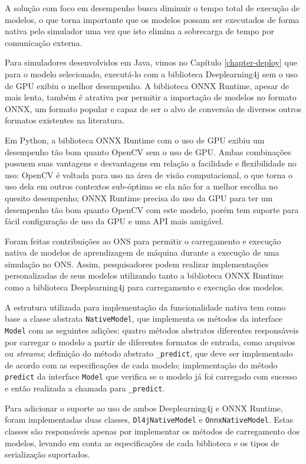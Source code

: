 A solução com foco em desempenho busca diminuir o tempo total de execução de modelos, o que torna importante que os modelos possam ser executados de forma nativa pelo simulador uma vez que isto elimina a sobrecarga de tempo por comunicação externa.

Para simuladores desenvolvidos em Java, vimos no Capítulo \ref{chapter-deploy} que para o modelo selecionado, executá-lo com a biblioteca Deeplearning4j sem o uso de GPU exibiu o melhor desempenho. A biblioteca ONNX Runtime, apesar de mais lenta, também é atrativa por permitir a importação de modelos no formato ONNX, um formato popular e capaz de ser o alvo de conversão de diversos outros formatos existentes na literatura.

Em Python, a biblioteca ONNX Runtime com o uso de GPU exibiu um desempenho tão bom quanto OpenCV sem o uso de GPU. Ambas combinações possuem suas vantagens e desvantagens em relação a facilidade e flexibilidade no uso: OpenCV é voltada para uso na área de visão computacional, o que torna o uso dela em outros contextos sub-óptimo se ela não for a melhor escolha no quesito desempenho; ONNX Runtime precisa do uso da GPU para ter um desempenho tão bom quanto OpenCV com este modelo, porém tem suporte para fácil configuração de uso da GPU e uma API mais amigável.

Foram feitas contribuições ao ONS para permitir o carregamento e execução nativa de modelos de aprendizagem de máquina durante a execução de uma simulação no ONS. Assim, pesquisadores podem realizar implementações personalizadas de seus modelos utilizando tanto a biblioteca ONNX Runtime como a biblioteca Deeplearning4j para carregamento e execução dos modelos.

A estrutura utilizada para implementação da funcionalidade nativa tem como base a classe abstrata \texttt{NativeModel}, que implementa os métodos da interface \texttt{Model} com as seguintes adições: quatro métodos abstratos diferentes responsáveis por carregar o modelo a partir de diferentes formatos de entrada, como arquivos ou \textit{streams}; definição do método abstrato \texttt{\_predict}, que deve ser implementado de acordo com as especificações de cada modelo; implementação do método \texttt{predict} da interface \texttt{Model} que verifica se o modelo já foi carregado com sucesso e então realizada a chamada para \texttt{\_predict}.

Para adicionar o suporte ao uso de ambos Deeplearning4j e ONNX Runtime, foram implementadas duas classes, \texttt{Dl4jNativeModel} e \texttt{OnnxNativeModel}. Estas classes são responsáveis apenas por implementar os métodos de carregamento dos modelos, levando em conta as especificações de cada biblioteca e os tipos de serialização suportados.

